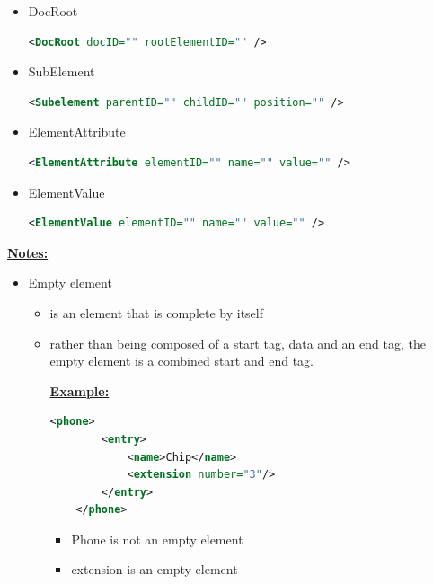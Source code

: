 \documentclass[12pt]{article}
\begin{document}
\begin{enumerate}[1.]
        \begin{itemize}
            \item DocRoot
    \begin{lstlisting}[language=XML]
    <DocRoot docID="" rootElementID="" />
    \end{lstlisting}
            \item SubElement
    \begin{lstlisting}[language=XML]
    <Subelement parentID="" childID="" position="" />
    \end{lstlisting}
            \item ElementAttribute
    \begin{lstlisting}[language=XML]
    <ElementAttribute elementID="" name="" value="" />
    \end{lstlisting}
            \item ElementValue
    \begin{lstlisting}[language=XML]
    <ElementValue elementID="" name="" value="" />
    \end{lstlisting}
        \end{itemize}

        \bigskip

        \underline{\textbf{Notes:}}

        \bigskip

        \begin{itemize}
            \item Empty element
            \begin{itemize}
                \item is an element that is complete by itself
                \item rather than being composed of a start tag, data
                and an end tag, the empty element is a combined start and end tag.

                \bigskip

                \underline{\textbf{Example:}}

                \bigskip

    \begin{lstlisting}[language=XML]
    <phone>
        <entry>
            <name>Chip</name>
            <extension number="3"/>
        </entry>
    </phone>
    \end{lstlisting}

                \bigskip

                \begin{itemize}
                    \item Phone is not an empty element
                    \item extension is an empty element
                \end{itemize}
            \end{itemize}
    \end{itemize}


\end{enumerate}
\end{document}
